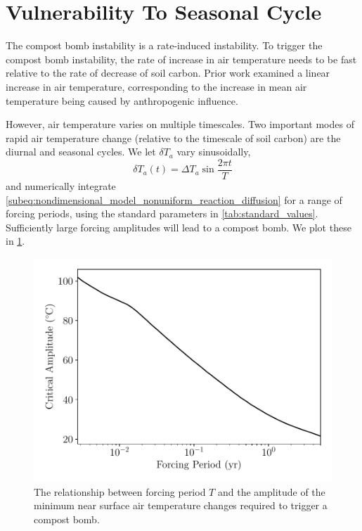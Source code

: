 \section{Vulnerability To Seasonal Cycle}
\label{sec:seasonal_cycle}
The compost bomb instability is a rate-induced instability. To trigger the compost bomb instability, the rate of increase in air temperature needs to be fast
relative to the rate of decrease of soil carbon. Prior work\cite{Luke2011} examined a linear increase in air temperature, corresponding to the increase in
mean air temperature being caused by anthropogenic influence.

However, air temperature varies on multiple timescales. Two important modes of rapid air temperature change (relative to the timescale of soil
carbon) are the diurnal and seasonal cycles. We let $\delta T_a$ vary sinusoidally,
\begin{equation}
  \label{eq:sinusoidal_forcing}
  \delta T_a(t) = \Delta T_a \sin \frac{2\pi t}{T}
\end{equation}
and numerically integrate \cref{subeq:nondimensional_model_nonuniform_reaction_diffusion} for a range of
forcing periods, using the standard parameters in \cref{tab:standard_values}. Sufficiently large forcing amplitudes will lead to a compost bomb.
We plot these in \cref{fig:forcing_frequency_vs_amplitude}.
\begin{figure}
  \centering
  \includegraphics[scale=0.5,keepaspectratio]{critical_amplitude_vs_period}
  \caption[Critical warming for periodic forcing]{The relationship between forcing period $T$ and the amplitude of the minimum near surface air temperature changes required to trigger a compost bomb.}
  \label{fig:forcing_frequency_vs_amplitude}
\end{figure}

